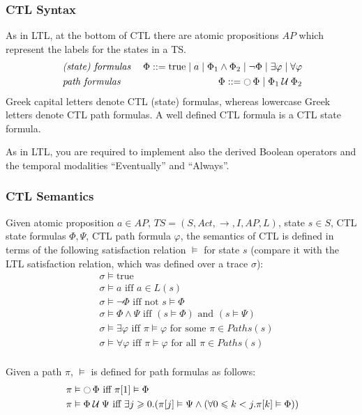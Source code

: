 \documentclass{article}
\begin{document}
\subsubsection*{CTL Syntax}
As  in LTL, at the bottom of CTL there are atomic propositions $AP$ which represent the labels for the states in a TS.
\begin{align*}
    &\; \emph{(state) formulas} &\; \Phi ::= \text{true} \mid a \mid \Phi_1 \land \Phi_2 \mid \neg \Phi \mid \exists \varphi \mid \forall \varphi \\
    &\; \emph{path formulas}    &\; \Phi ::= \mathop{\ocircle}{\Phi} \mid \Phi_1 \mathbin{\mathcal{U}} \Phi_2
\end{align*}
Greek capital letters denote CTL (state) formulas, whereas lowercase Greek letters denote CTL path formulas. 
A well defined CTL formula is a CTL state formula.

As in LTL, you are required to implement also the derived Boolean operators and the temporal modalities ``Eventually'' and ``Always''.

\subsubsection*{CTL Semantics}
Given atomic proposition $a \in AP$, $TS = (S, Act, \rightarrow, I, AP, L)$, state $s \in S$, CTL state formulas 
$\Phi, \Psi$, CTL path formula $\varphi$, the semantics of CTL is defined in terms of the following 
satisfaction relation $\vDash$ for state $s$ (compare it with the LTL satisfaction relation, which was defined over a trace $\sigma$):
\begin{align*}
    &\; \sigma \vDash \text{true} \\
    &\; \sigma \vDash a \text{ iff } a \in L(s) \\ 
    &\; \sigma \vDash \neg \Phi \text{ iff not } s \vDash \Phi \\
    &\; \sigma \vDash \Phi \land \Psi \text{ iff } (s \vDash \Phi) \text{ and } (s \vDash \Psi) \\
    &\; \sigma \vDash \exists \varphi \text{ iff } \pi \vDash \varphi \text{ for some } \pi \in Paths(s) \\ 
    &\; \sigma \vDash \forall \varphi \text{ iff } \pi \vDash \varphi \text{ for all } \pi \in Paths(s) \\ 
\end{align*}

Given a path $\pi$, $\vDash$ is defined for path formulas as follows: 
\begin{align*}
    &\; \pi \vDash \mathop{\ocircle}{\Phi} \text{ iff } \pi[1]  \vDash \Phi \\ 
    &\; \pi \vDash \Phi \mathbin{\mathcal{U}} \Psi \text{ iff } \exists j \geqslant 0. (\pi[j]  \vDash \Psi \land (\forall 0 \leqslant k < j. \pi[k]  \vDash \Phi))
\end{align*}
\end{document}
